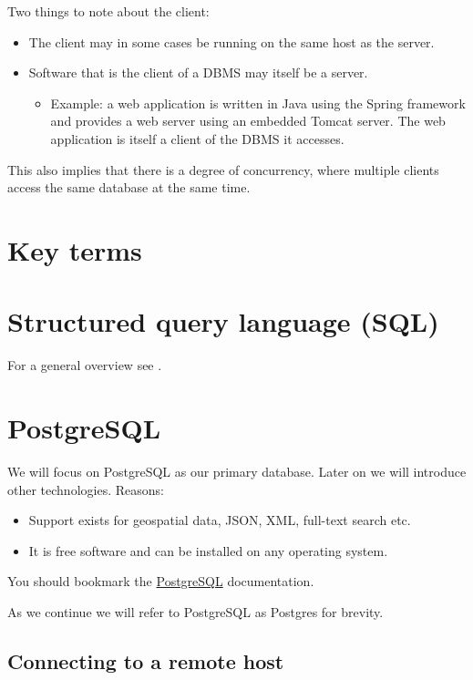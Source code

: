 \documentclass{pgnotes}
\begin{document}
Two things to note about the client:
\begin{itemize}
\item The client may in some cases be running on the same host as the server.
\item Software that is the client of a DBMS may itself be a server.
  \begin{itemize}
  \item Example: a web application is written in Java using the Spring framework and provides a web server using an embedded Tomcat server. The web application is itself a client of the DBMS it accesses.
  \end{itemize}
\end{itemize}

This also implies that there is a degree of concurrency, where multiple clients access the same database at the same time.


\section{Key terms}




\section{Structured query language (SQL)}
\label{sec:sql}

For a general overview see \citep{chamberlain:2012:early}.


\section{PostgreSQL}
\label{sec:postgresql}

We will focus on PostgreSQL as our primary database.
Later on we will introduce other technologies. 
Reasons:
\begin{itemize}
\item Support exists for geospatial data, JSON, XML, full-text search etc.
\item It is free software and can be installed on any operating system.
\end{itemize}
You should bookmark the \href{https://www.postgresql.org/docs/13/}{PostgreSQL} documentation.

As we continue we will refer to PostgreSQL as Postgres for brevity.


\subsection{Connecting to a remote host}






\end{document}
